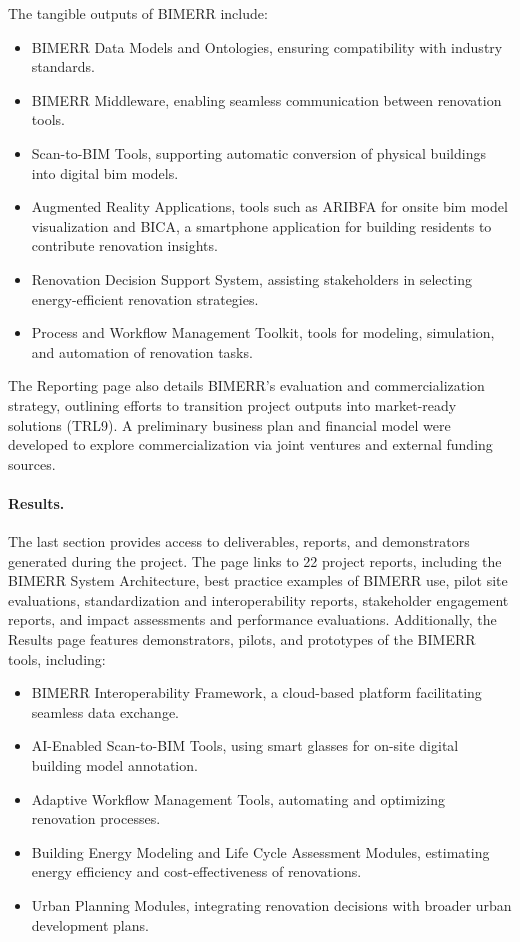 The tangible outputs of BIMERR include:
\begin{itemize}
    \item BIMERR Data Models and Ontologies, ensuring compatibility with industry standards.
    \item BIMERR Middleware, enabling seamless communication between renovation tools.
    \item Scan-to-BIM Tools, supporting automatic conversion of physical buildings into digital \gls{bim} models.
    \item Augmented Reality Applications, tools such as ARIBFA for onsite \gls{bim} model visualization and BICA, a smartphone application for building residents to contribute renovation insights.
    \item Renovation Decision Support System, assisting stakeholders in selecting energy-efficient renovation strategies.
    \item Process and Workflow Management Toolkit, tools for modeling, simulation, and automation of renovation tasks.
\end{itemize}
	
The Reporting page also details BIMERR's evaluation and commercialization strategy, outlining efforts to transition project outputs into market-ready solutions (TRL9).
A preliminary business plan and financial model were developed to explore commercialization via joint ventures and external funding sources.

\paragraph*{Results.}
The last section provides access to deliverables, reports, and demonstrators generated during the project.
The page links to 22 project reports, including the BIMERR System Architecture, best practice examples of BIMERR use, pilot site evaluations, standardization and interoperability reports, stakeholder engagement reports, and impact assessments and performance evaluations.
Additionally, the Results page features demonstrators, pilots, and prototypes of the BIMERR tools, including:
\begin{itemize}
    \item BIMERR Interoperability Framework, a cloud-based platform facilitating seamless data exchange.
    \item AI-Enabled Scan-to-BIM Tools, using smart glasses for on-site digital building model annotation.
    \item Adaptive Workflow Management Tools, automating and optimizing renovation processes.
    \item Building Energy Modeling and Life Cycle Assessment Modules, estimating energy efficiency and cost-effectiveness of renovations.
    \item Urban Planning Modules, integrating renovation decisions with broader urban development plans.
\end{itemize}

